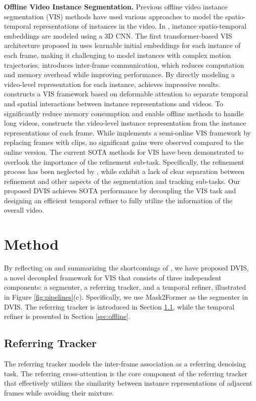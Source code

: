 \documentclass[10pt,twocolumn,letterpaper]{article}
\begin{document}
\textbf{Offline Video Instance Segmentation.} Previous offline video instance segmentation (VIS) methods have used various approaches to model the spatio-temporal representations of instances in the video. In \cite{stemseg}, instance spatio-temporal embeddings are modeled using a 3D CNN. The first transformer-based VIS architecture proposed in \cite{vistr} uses learnable initial embeddings for each instance of each frame, making it challenging to model instances with complex motion trajectories. \cite{ifc} introduces inter-frame communication, which reduces computation and memory overhead while improving performance. By directly modeling a video-level representation for each instance, \cite{mask2formervis} achieves impressive results. \cite{seqformer} constructs a VIS framework based on deformable attention \cite{deformabledetr} to separate temporal and spatial interactions between instance representations and videos. To significantly reduce memory consumption and enable offline methods to handle long videos, \cite{vita} constructs the video-level instance representation from the instance representations of each frame. While \cite{genvis} implements a semi-online VIS framework by replacing frames with clips, no significant gains were observed compared to the online version. The current SOTA methods for VIS have been demonstrated to overlook the importance of the refinement sub-task. Specifically, the refinement process has been neglected by \cite{idol,minvis,rovis,genvis}, while \cite{ifc,mask2formervis,seqformer,vita} exhibit a lack of clear separation between refinement and other aspects of the segmentation and tracking sub-tasks. Our proposed DVIS achieves SOTA performance by decoupling the VIS task and designing an efficient temporal refiner to fully utilize the information of the overall video.
\section{Method}
By reflecting on and summarizing the shortcomings of \cite{minvis,vita}, we have proposed DVIS, a novel decoupled framework for VIS that consists of three independent components: a segmenter, a referring tracker, and a temporal refiner, illustrated in Figure \ref{fig:pipelines}(c). Specifically, we use Mask2Former \cite{mask2former} as the segmenter in DVIS. The referring tracker is introduced in Section \ref{sec:online}, while the temporal refiner is presented in Section \ref{sec:offline}.

\subsection{Referring Tracker}\label{sec:online}
The referring tracker models the inter-frame association as a referring denoising task. The referring cross-attention is the core component of the referring tracker that effectively utilizes the similarity between instance representations of adjacent frames while avoiding their mixture.
\end{document}
